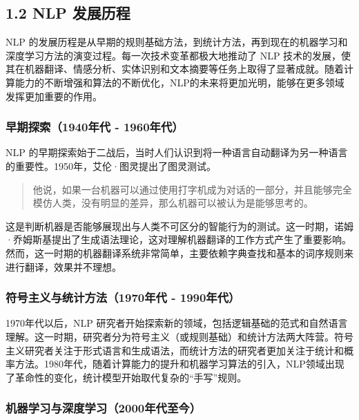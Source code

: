 \documentclass[12pt,a4paper]{book}
\begin{document}
\subsection{1.2 NLP 发展历程}\label{nlp-ux53d1ux5c55ux5386ux7a0b}

NLP
的发展历程是从早期的规则基础方法，到统计方法，再到现在的机器学习和深度学习方法的演变过程。每一次技术变革都极大地推动了
NLP
技术的发展，使其在机器翻译、情感分析、实体识别和文本摘要等任务上取得了显著成就。随着计算能力的不断增强和算法的不断优化，NLP的未来将更加光明，能够在更多领域发挥更加重要的作用。

\subsubsection{早期探索（1940年代 -
1960年代）}\label{ux65e9ux671fux63a2ux7d221940ux5e74ux4ee3---1960ux5e74ux4ee3}

NLP
的早期探索始于二战后，当时人们认识到将一种语言自动翻译为另一种语言的重要性。1950年，艾伦·图灵提出了图灵测试。

\begin{quote}
他说，如果一台机器可以通过使用打字机成为对话的一部分，并且能够完全模仿人类，没有明显的差异，那么机器可以被认为是能够思考的。
\end{quote}

这是判断机器是否能够展现出与人类不可区分的智能行为的测试。这一时期，诺姆·乔姆斯基提出了生成语法理论，这对理解机器翻译的工作方式产生了重要影响。然而，这一时期的机器翻译系统非常简单，主要依赖字典查找和基本的词序规则来进行翻译，效果并不理想。

\subsubsection{符号主义与统计方法（1970年代 -
1990年代）}\label{ux7b26ux53f7ux4e3bux4e49ux4e0eux7edfux8ba1ux65b9ux6cd51970ux5e74ux4ee3---1990ux5e74ux4ee3}

1970年代以后，NLP
研究者开始探索新的领域，包括逻辑基础的范式和自然语言理解。这一时期，研究者分为符号主义（或规则基础）和统计方法两大阵营。符号主义研究者关注于形式语言和生成语法，而统计方法的研究者更加关注于统计和概率方法。1980年代，随着计算能力的提升和机器学习算法的引入，NLP领域出现了革命性的变化，统计模型开始取代复杂的``手写''规则。

\subsubsection{机器学习与深度学习（2000年代至今）}\label{ux673aux5668ux5b66ux4e60ux4e0eux6df1ux5ea6ux5b66ux4e602000ux5e74ux4ee3ux81f3ux4eca}
\end{document}
